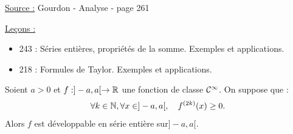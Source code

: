 

\newcommand{\dse}{développable en série entière }

\pagestyle{fancy}

\fancyhead[C]{}
\fancyhead[R]{}



\underline{Source :} Gourdon - Analyse - page 261

\underline{Leçons :}
\begin{itemize}
\item 243 : Séries entières, propriétés de la somme. Exemples et applications.
\item 218 : Formules de Taylor. Exemples et applications.
\end{itemize}

\begin{thm}
Soient $a>0$ et $f : ]-a, a[ \to \mathbb{R}$ une fonction de classe $\mathcal{C}^{\infty}$. On suppose que :
\[ \forall k \in \mathbb{N}, \forall x \in ]-a, a[, \quad f^{(2k)}(x) \geq 0 . \]
Alors $f$ est développable en série entière sur$]-a,a[$.
\end{thm}

